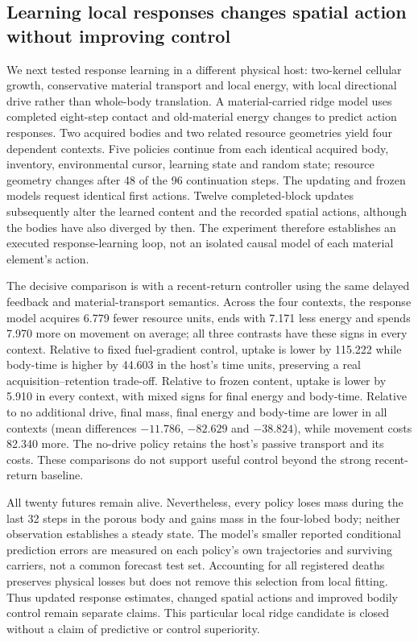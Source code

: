 \subsection*{Learning local responses changes spatial action without improving control}
We next tested response learning in a different physical host: two-kernel cellular growth, conservative material transport and local energy, with local directional drive rather than whole-body translation. A material-carried ridge model uses completed eight-step contact and old-material energy changes to predict action responses. Two acquired bodies and two related resource geometries yield four dependent contexts. Five policies continue from each identical acquired body, inventory, environmental cursor, learning state and random state; resource geometry changes after 48 of the 96 continuation steps. The updating and frozen models request identical first actions. Twelve completed-block updates subsequently alter the learned content and the recorded spatial actions, although the bodies have also diverged by then. The experiment therefore establishes an executed response-learning loop, not an isolated causal model of each material element's action.

The decisive comparison is with a recent-return controller using the same delayed feedback and material-transport semantics. Across the four contexts, the response model acquires 6.779 fewer resource units, ends with 7.171 less energy and spends 7.970 more on movement on average; all three contrasts have these signs in every context. Relative to fixed fuel-gradient control, uptake is lower by 115.222 while body-time is higher by 44.603 in the host's time units, preserving a real acquisition--retention trade-off. Relative to frozen content, uptake is lower by 5.910 in every context, with mixed signs for final energy and body-time. Relative to no additional drive, final mass, final energy and body-time are lower in all contexts (mean differences $-11.786$, $-82.629$ and $-38.824$), while movement costs 82.340 more. The no-drive policy retains the host's passive transport and its costs. These comparisons do not support useful control beyond the strong recent-return baseline.

All twenty futures remain alive. Nevertheless, every policy loses mass during the last 32 steps in the porous body and gains mass in the four-lobed body; neither observation establishes a steady state. The model's smaller reported conditional prediction errors are measured on each policy's own trajectories and surviving carriers, not a common forecast test set. Accounting for all registered deaths preserves physical losses but does not remove this selection from local fitting. Thus updated response estimates, changed spatial actions and improved bodily control remain separate claims. This particular local ridge candidate is closed without a claim of predictive or control superiority.

